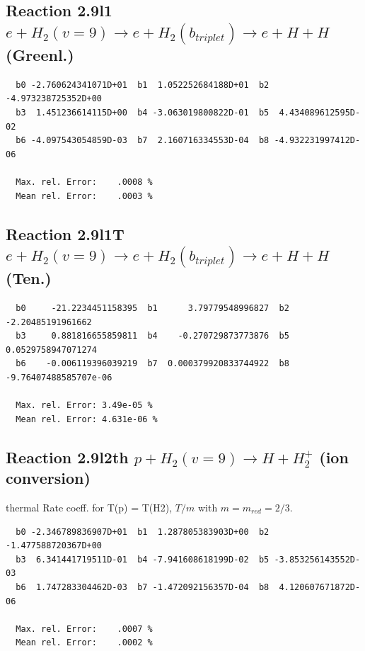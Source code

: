 \documentclass[12pt,dvipdfmx]{article}
\begin{document}
\newpage
\subsection{
Reaction 2.9l1
$ e + H_2(v=9) \rightarrow e + H_2(b_{triplet})\rightarrow e + H + H $ (Greenl.)
}


\begin{small}\begin{verbatim}
  b0 -2.760624341071D+01  b1  1.052252684188D+01  b2 -4.973238725352D+00
  b3  1.451236614115D+00  b4 -3.063019800822D-01  b5  4.434089612595D-02
  b6 -4.097543054859D-03  b7  2.160716334553D-04  b8 -4.932231997412D-06

  Max. rel. Error:    .0008 %
  Mean rel. Error:    .0003 %
\end{verbatim}\end{small}


\subsection{
Reaction 2.9l1T
$ e +  H_2(v=9) \rightarrow e + H_2(b_{triplet}) \rightarrow e + H + H $ (Ten.)
}


\begin{small}\begin{verbatim}
  b0     -21.2234451158395  b1      3.79779548996827  b2     -2.20485191961662
  b3     0.881816655859811  b4    -0.270729873773876  b5    0.0529758947071274
  b6    -0.006119396039219  b7  0.000379920833744922  b8 -9.76407488585707e-06

  Max. rel. Error: 3.49e-05 %
  Mean rel. Error: 4.631e-06 %
\end{verbatim}\end{small}


\subsection{
Reaction 2.9l2th
$ p + H_2(v=9) \rightarrow H + H_2^+$ (ion conversion)
}
thermal Rate coeff. for T(p) = T(H2),
$T/m$ with $m=m_{red}=2/3$.

\begin{small}\begin{verbatim}
  b0 -2.346789836907D+01  b1  1.287805383903D+00  b2 -1.477588720367D+00
  b3  6.341441719511D-01  b4 -7.941608618199D-02  b5 -3.853256143552D-03
  b6  1.747283304462D-03  b7 -1.472092156357D-04  b8  4.120607671872D-06

  Max. rel. Error:    .0007 %
  Mean rel. Error:    .0002 %
\end{verbatim}\end{small}
\end{document}
